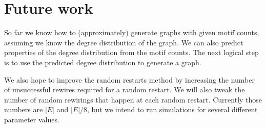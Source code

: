 \section{Future work}
\label{sec:futurework}

So far we know how to (approximately) generate graphs with given motif counts, assuming we know the degree distribution of the graph.  We can also predict properties of the degree distribution from the motif counts.  The next logical step is to use the predicted degree distribution to generate a graph.

We also hope to improve the random restarts method by increasing the number of unsuccessful rewires required for a random restart.  We will also tweak the number of random rewirings that happen at each random restart.  Currently those numbers are $|E|$ and $|E|/8$, but we intend to run simulations for several different parameter values.



